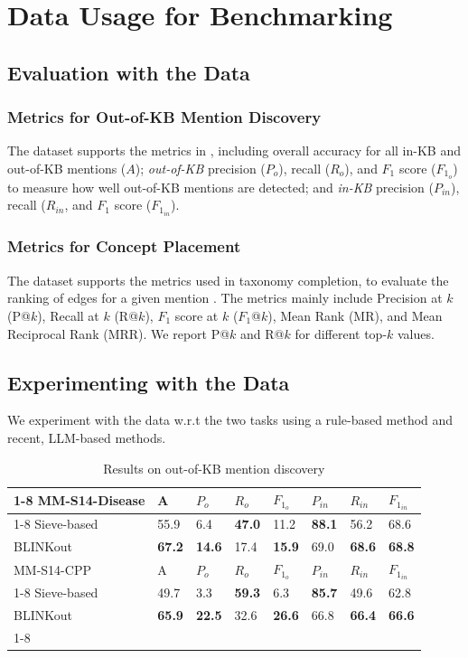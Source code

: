 \documentclass[sigconf]{acmart}
\begin{document}
\section{Data Usage for Benchmarking}

\subsection{Evaluation with the Data}
\subsubsection*{Metrics for Out-of-KB Mention Discovery} The dataset supports the metrics in \cite{dong2023NIL}, including overall accuracy for all in-KB and out-of-KB mentions ($A$); \textit{out-of-KB} precision ($P_o$), recall ($R_o$), and $F_1$ score ($F_{1_o}$) to measure how well out-of-KB mentions are detected; and \textit{in-KB} precision ($P_{in}$), recall ($R_{in}$, and $F_1$ score ($F_{1_{in}}$).

\subsubsection*{Metrics for Concept Placement} The dataset supports the metrics used in taxonomy completion, to evaluate the ranking of edges for a given mention \cite{zhang2021TMN,Jiang2022taxoenrich,Shen2020TaxoExpan}. The metrics mainly include Precision at $k$ (P@$k$), Recall at $k$ (R@$k$), $F_1$ score at $k$ ($F_1$@$k$), Mean Rank (MR), and Mean Reciprocal Rank (MRR). We report P@$k$ and R@$k$ for different top-$k$ values.

\subsection{Experimenting with the Data}
We experiment with the data w.r.t the two tasks using a rule-based method and recent, LLM-based methods.

\begin{table}
\small
\caption{Results on out-of-KB mention discovery}\label{out-of-KB-res}
\begin{tabular}{l|l|lll|lll}
\cline{1-8}
MM-S14-Disease & A & $P_o$ & $R_o$ & $F_{1_o}$ & $P_{in}$ & $R_{in}$ & $F_{1_{in}}$    \\
\cline{1-8}
Sieve-based & 55.9 & 6.4      & \textbf{47.0}  & 11.2 & \textbf{88.1} & 56.2 & 68.6  \\
BLINKout       & \textbf{67.2} & \textbf{14.6}      & 17.4     & \textbf{15.9} & 69.0 & \textbf{68.6} & \textbf{68.8}  \\
\hline\hline
MM-S14-CPP     & A & $P_o$ & $R_o$ & $F_{1_o}$ & $P_{in}$ & $R_{in}$ & $F_{1_{in}}$    \\
\cline{1-8}
Sieve-based & 49.7 & 3.3      & \textbf{59.3}   & 6.3 & \textbf{85.7} & 49.6 & 62.8  \\
BLINKout       & \textbf{65.9} & \textbf{22.5}          & 32.6      & \textbf{26.6} & 66.8 & \textbf{66.4} & \textbf{66.6}     \\
\cline{1-8}
\end{tabular}
\end{table}
\end{document}
